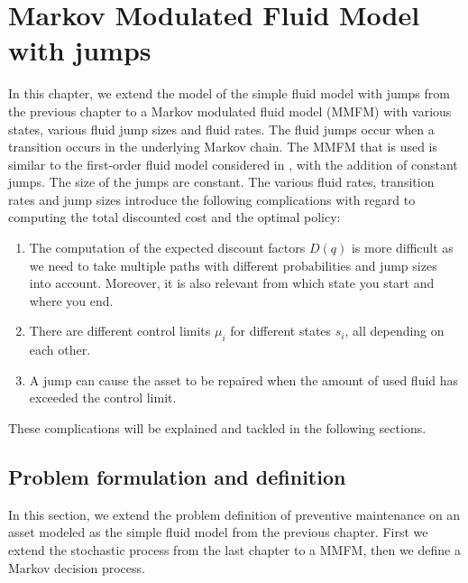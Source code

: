 \documentclass[a4paper]{thesis}
\theoremstyle{definition}
\begin{document}
\chapter{Markov Modulated Fluid Model with jumps}\label{chapter:Mmfm}
In this chapter, we extend the model of the simple fluid model with jumps from the previous chapter to a Markov modulated fluid model (MMFM) with various states, various fluid jump sizes and fluid rates.
The fluid jumps occur when a transition occurs in the underlying Markov chain.
The MMFM that is used is similar to the first-order fluid model considered in \cite{Gribaudo2007}, with the addition of constant jumps.
The size of the jumps are constant.
The various fluid rates, transition rates and jump sizes introduce the following complications with regard to computing the total discounted cost and the optimal policy:
\begin{enumerate}
	\item The computation of the expected discount factors $D(q)$ is more difficult as we need to take multiple
	paths with different probabilities and jump sizes into account.
	Moreover, it is also relevant from which state you start and where you end.
	\item There are different control limits $\mu_i$ for different states $s_i$, all depending on each other.
	\item A jump can cause the asset to be repaired when the amount of used fluid has exceeded the control limit.
\end{enumerate}
These complications will be explained and tackled in the following sections.
\section{Problem formulation and definition}
In this section, we extend the problem definition of preventive maintenance on an asset modeled as the simple fluid model from the previous chapter.
First we extend the stochastic process from the last chapter to a MMFM, then we define a Markov decision process.
\end{document}

